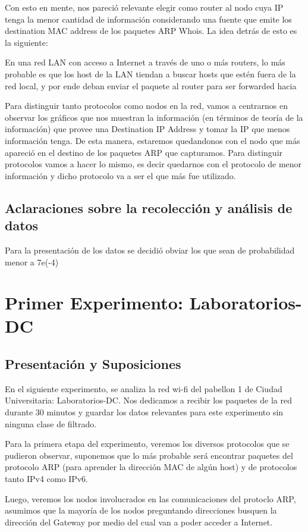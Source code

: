 \documentclass{article}
\theoremstyle{definition}
\theoremstyle{remark}
\begin{document}
Con esto en mente, nos pareció relevante elegir como router al nodo cuya IP tenga la menor cantidad de información considerando una fuente que emite los destination MAC address de los paquetes ARP Whois. La idea detrás de esto es la siguiente:

En una red LAN con acceso a Internet a través de uno o más routers, lo más probable es que los host de la LAN tiendan a buscar hosts que estén fuera de la red local, y por ende deban enviar el paquete al router para ser forwarded hacia 

Para distinguir tanto protocolos como nodos en la red, vamos a centrarnos en observar los gráficos que nos muestran la información (en términos de teoría de la información) que provee una Destination IP Address y tomar la IP que menos información tenga. De esta manera, estaremos quedandonos con el nodo que más apareció en el destino de los paquetes ARP que capturamos. Para distinguir protocolos vamos a hacer lo mismo, es decir quedarnos con el protocolo de menor información y dicho protocolo va a ser el que más fue utilizado.

\subsection{Aclaraciones sobre la recolección y análisis de datos}
Para la presentación de los datos se decidió obviar los que sean de probabilidad menor a 7e(-4)


\newpage
\section{Primer Experimento: Laboratorios-DC}

\subsection{Presentación y Suposiciones}

En el siguiente experimento, se analiza la red wi-fi del pabellon 1 de Ciudad Universitaria: Laboratorios-DC. Nos dedicamos a recibir los paquetes de la red durante 30 minutos y guardar los datos relevantes para este experimento sin ninguna clase de filtrado.

Para la primera etapa del experimento, veremos los diversos protocolos que se pudieron observar, suponemos que lo más probable será encontrar paquetes del protocolo ARP (para aprender la dirección MAC de algún host) y de protocolos tanto IPv4 como IPv6.

Luego, veremos los nodos involucrados en las comunicaciones del protoclo ARP, asumimos que la mayoría de los nodos preguntando direcciones busquen la dirección del Gateway por medio del cual van a poder acceder a Internet.
\end{document}
